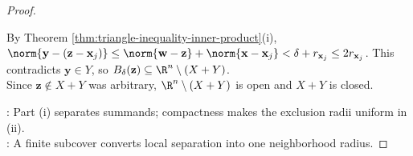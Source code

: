 \begin{proposition}
\begin{proof}
\begin{enumerate}[label=(\roman*)]
By Theorem \ref{thm:triangle-inequality-inner-product}(i), $\norm{\mathbf{y}-(\mathbf{z}-\mathbf{x}_j)}\leq\norm{\mathbf{w}-\mathbf{z}}+\norm{\mathbf{x}-\mathbf{x}_j}<\delta+r_{\mathbf{x}_j}\leq2r_{\mathbf{x}_j}$. This contradicts $\mathbf{y}\in Y$, so $B_\delta(\mathbf{z})\subseteq\R^n\setminus(X+Y)$.\\
Since $\mathbf{z}\notin X+Y$ was arbitrary, $\R^n\setminus(X+Y)$ is open and $X+Y$ is closed.
\end{enumerate}
: Part (i) separates summands; compactness makes the exclusion radii uniform in (ii).\\
: A finite subcover converts local separation into one neighborhood radius.
\end{proof}
\end{proposition}
